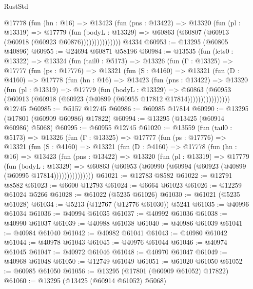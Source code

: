 \begin{lexlean}{RustStd}
\begin{coremodule}
                @17778
                  (fun (hn : @16) =>
                  @13423
                    (fun (pns : @13422) =>
                    @13320
                      (fun (pl : @13319) =>
                      @17779
                        (fun (bodyL : @13329) =>
                        @60863 (@60807 (@60913 (@60918 (@60923 @60876)))))))))))))))
    @4334
@60953 := @13295 (@60805 @40896)
@60955 := @24694 @60871 @58196
@60984 := @13535
    (fun (lets0 : @13322) =>
    @13324
      (fun (tail0 : @5173) =>
      @13326
        (fun (Γ : @13325) =>
        @17777
          (fun (ps : @17776) =>
          @13321
            (fun (S : @4160) =>
            @13321
              (fun (D : @4160) =>
              @17778
                (fun (hn : @16) =>
                @13423
                  (fun (pns : @13422) =>
                  @13320
                    (fun (pl : @13319) =>
                    @17779
                      (fun (bodyL : @13329) =>
                      @60863
                        (@60953
                          (@60913 (@60918 (@60923 (@40899 (@60955 @17812 @17814))))))))))))))))
    @12745
@60985 := @5157 @12745
@60986 := @60985 @17814
@60990 := @13295 (@17801 (@60909 @60986) @17822)
@60994 := @13295 (@13425 (@60914 @60986) @5068)
@60995 := @60955 @12745
@61020 := @13559
    (fun (tail0 : @5173) =>
    @13326
      (fun (Γ : @13325) =>
      @17777
        (fun (ps : @17776) =>
        @13321
          (fun (S : @4160) =>
          @13321
            (fun (D : @4160) =>
            @17778
              (fun (hn : @16) =>
              @13423
                (fun (pns : @13422) =>
                @13320
                  (fun (pl : @13319) =>
                  @17779
                    (fun (bodyL : @13329) =>
                    @60863 (@60953 (@60990 (@60994 (@60923 (@40899 (@60995 @17814)))))))))))))))
@61021 := @12783 @8582
@61022 := @12791 @8582
@61023 := @6600 @12793
@61024 := @6664 @61023
@61026 := @12259 @61024 @5266
@61028 := @61022 (@5235 @61026)
@61030 := @61021 (@5235 @61028)
@61034 := @5213 (@12767 (@12776 @61030)) @5241
@61035 := @40996 @61034
@61036 := @40994 @61035
@61037 := @40992 @61036
@61038 := @40990 @61037
@61039 := @40988 @61038
@61040 := @40986 @61039
@61041 := @40984 @61040
@61042 := @40982 @61041
@61043 := @40980 @61042
@61044 := @40978 @61043
@61045 := @40976 @61044
@61046 := @40974 @61045
@61047 := @40972 @61046
@61048 := @40970 @61047
@61049 := @40968 @61048
@61050 := @12749 @61049
@61051 := @61020 @61050
@61052 := @60985 @61050
@61056 := @13295 (@17801 (@60909 @61052) @17822)
@61060 := @13295 (@13425 (@60914 @61052) @5068)

\end{coremodule}
\end{lexlean}
